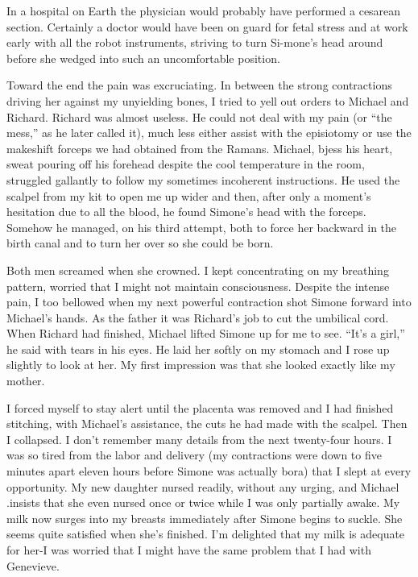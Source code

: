 \documentclass[]{article}
\begin{document}
In a hospital on Earth the physician would probably have performed a cesarean section.  Certainly a doctor would have been on guard for fetal stress and at work early with all the robot instruments, striving to turn Si-mone’s head around before she wedged into such an uncomfortable position.

Toward the end the pain was excruciating.  In between the strong contractions driving her against my unyielding bones, I tried to yell out orders to Michael and Richard.  Richard was almost useless.  He could not deal with my pain (or “the mess,” as he later called it), much less either assist with the episiotomy or use the makeshift forceps we had obtained from the Ramans.  Michael, bjess his heart, sweat pouring off his forehead despite the cool temperature in the room, struggled gallantly to follow my sometimes incoherent instructions.  He used the scalpel from my kit to open me up wider and then, after only a moment’s hesitation due to all the blood, he found Simone’s head with the forceps.  Somehow he managed, on his third attempt, both to force her backward in the birth canal and to turn her over so she could be born.

Both men screamed when she crowned.  I kept concentrating on my breathing pattern, worried that I might not maintain consciousness.  Despite the intense pain, I too bellowed when my next powerful contraction shot Simone forward into Michael’s hands.  As the father it was Richard’s job to cut the umbilical cord.  When Richard had finished, Michael lifted Simone up for me to see.  “It’s a girl,” he said with tears in his eyes.  He laid her softly on my stomach and I rose up slightly to look at her.  My first impression was that she looked exactly like my mother.

I forced myself to stay alert until the placenta was removed and I had finished stitching, with Michael’s assistance, the cuts he had made with the scalpel.  Then I collapsed.  I don’t remember many details from the next twenty-four hours.  I was so tired from the labor and delivery (my contractions were down to five minutes apart eleven hours before Simone was actually bora) that I slept at every opportunity.  My new daughter nursed readily, without any urging, and Michael .insists that she even nursed once or twice while I was only partially awake.  My milk now surges into my breasts immediately after Simone begins to suckle.  She seems quite satisfied when she’s finished.  I’m delighted that my milk is adequate for her-I was worried that I might have the same problem that I had with Genevieve.
\end{document}
